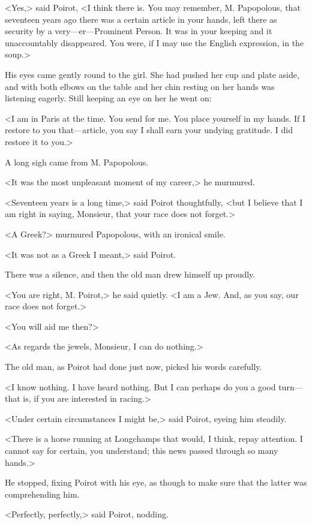 <Yes,> said Poirot, <I think there is. You may remember, M. Papopolous, that seventeen years ago there was a certain article in your hands, left there as security by a very—er—Prominent Person. It was in your keeping and it unaccountably disappeared. You were, if I may use the English expression, in the soup.>

His eyes came gently round to the girl. She had pushed her cup and plate aside, and with both elbows on the table and her chin resting on her hands was listening eagerly. Still keeping an eye on her he went on:

<I am in Paris at the time. You send for me. You place yourself in my hands. If I restore to you that—article, you say I shall earn your undying gratitude.  I did restore it to you.>

A long sigh came from M. Papopolous.

<It was the most unpleasant moment of my career,> he murmured.

<Seventeen years is a long time,> said Poirot thoughtfully, <but I believe that I am right in saying, Monsieur, that your race does not forget.>

<A Greek?> murmured Papopolous, with an ironical smile.

<It was not as a Greek I meant,> said Poirot.

There was a silence, and then the old man drew himself up proudly.

<You are right, M. Poirot,> he said quietly. <I am a Jew. And, as you say, our race does not forget.>

<You will aid me then?>

<As regards the jewels, Monsieur, I can do nothing.>

The old man, as Poirot had done just now, picked his words carefully.

<I know nothing. I have heard nothing. But I can perhaps do you a good turn—that is, if you are interested in racing.>

<Under certain circumstances I might be,> said Poirot, eyeing him steadily.

<There is a horse running at Longchamps that would, I think, repay attention. I cannot say for certain, you understand; this news passed through so many hands.>

He stopped, fixing Poirot with his eye, as though to make sure that the latter was comprehending him.

<Perfectly, perfectly,> said Poirot, nodding.

